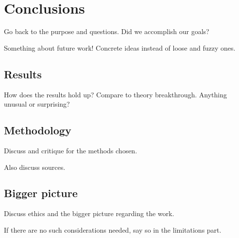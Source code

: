 \chapter{Conclusions}\label{cha:conclusions}

Go back to the purpose and questions. Did we accomplish our goals?

Something about future work! Concrete ideas instead of loose and fuzzy ones.


\section{Results}\label{sec:conclusions:results}

How does the results hold up? Compare to theory breakthrough. Anything unusual or surprising?


\section{Methodology}\label{sec:conclusions:method}

Discuss and critique for the methods chosen.

Also discuss sources.


\section{Bigger picture}\label{sec:conclusions:big}

Discuss ethics and the bigger picture regarding the work.

If there are no such considerations needed, say so in the limitations part.
